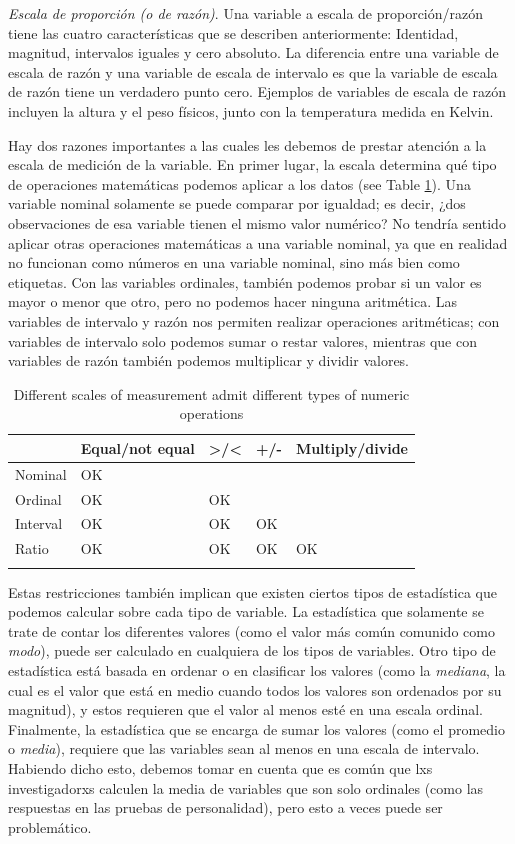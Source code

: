 \documentclass[
  12pt,
]{book}
\begin{document}
\emph{Escala de proporción (o de razón)}. Una variable a escala de proporción/razón tiene las cuatro características que se describen anteriormente: Identidad, magnitud, intervalos iguales y cero absoluto. La diferencia entre una variable de escala de razón y una variable de escala de intervalo es que la variable de escala de razón tiene un verdadero punto cero. Ejemplos de variables de escala de razón incluyen la altura y el peso físicos, junto con la temperatura medida en Kelvin.

Hay dos razones importantes a las cuales les debemos de prestar atención a la escala de medición de la variable. En primer lugar, la escala determina qué tipo de operaciones matemáticas podemos aplicar a los datos (see Table \ref{tab:MeasurementTypes}). Una variable nominal solamente se puede comparar por igualdad; es decir, ¿dos observaciones de esa variable tienen el mismo valor numérico? No tendría sentido aplicar otras operaciones matemáticas a una variable nominal, ya que en realidad no funcionan como números en una variable nominal, sino más bien como etiquetas. Con las variables ordinales, también podemos probar si un valor es mayor o menor que otro, pero no podemos hacer ninguna aritmética. Las variables de intervalo y razón nos permiten realizar operaciones aritméticas; con variables de intervalo solo podemos sumar o restar valores, mientras que con variables de razón también podemos multiplicar y dividir valores.

\begin{table}

\caption{\label{tab:MeasurementTypes}Different scales of measurement admit different types of numeric operations}
\centering
\begin{tabular}[t]{lllll}
\toprule{}
  & Equal/not equal & >/< & +/- & Multiply/divide\\
\midrule{}
Nominal & OK &  &  & \\
Ordinal & OK & OK &  & \\
Interval & OK & OK & OK & \\
Ratio & OK & OK & OK & OK\\
\bottomrule{}
\end{tabular}
\end{table}

Estas restricciones también implican que existen ciertos tipos de estadística que podemos calcular sobre cada tipo de variable. La estadística que solamente se trate de contar los diferentes valores (como el valor más común comunido como \emph{modo}), puede ser calculado en cualquiera de los tipos de variables. Otro tipo de estadística está basada en ordenar o en clasificar los valores (como la \emph{mediana}, la cual es el valor que está en medio cuando todos los valores son ordenados por su magnitud), y estos requieren que el valor al menos esté en una escala ordinal. Finalmente, la estadística que se encarga de sumar los valores (como el promedio o \emph{media}), requiere que las variables sean al menos en una escala de intervalo. Habiendo dicho esto, debemos tomar en cuenta que es común que lxs investigadorxs calculen la media de variables que son solo ordinales (como las respuestas en las pruebas de personalidad), pero esto a veces puede ser problemático.
\end{document}

